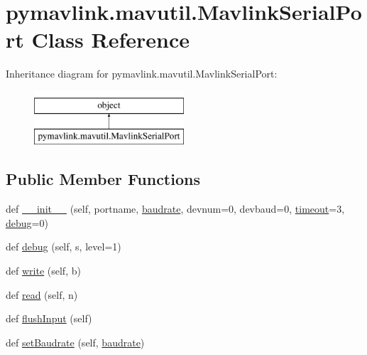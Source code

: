 \hypertarget{classpymavlink_1_1mavutil_1_1MavlinkSerialPort}{}\section{pymavlink.\+mavutil.\+Mavlink\+Serial\+Port Class Reference}
\label{classpymavlink_1_1mavutil_1_1MavlinkSerialPort}
Inheritance diagram for pymavlink.\+mavutil.\+Mavlink\+Serial\+Port\+:\begin{figure}[H]
\begin{center}
\leavevmode
\includegraphics[height=2.000000cm]{classpymavlink_1_1mavutil_1_1MavlinkSerialPort}
\end{center}
\end{figure}
\subsection*{Public Member Functions}
\begin{DoxyCompactItemize}
\item 
def \mbox{\hyperlink{classpymavlink_1_1mavutil_1_1MavlinkSerialPort_ab3d1f1a5a2d3f30628aa6b2e5c8822f0}{\+\_\+\+\_\+init\+\_\+\+\_\+}} (self, portname, \mbox{\hyperlink{classpymavlink_1_1mavutil_1_1MavlinkSerialPort_ab3e0c5df3be011a0a9f99cc75a87ac55}{baudrate}}, devnum=0, devbaud=0, \mbox{\hyperlink{classpymavlink_1_1mavutil_1_1MavlinkSerialPort_a4d25142b726458574a0e15fc6cf97d04}{timeout}}=3, \mbox{\hyperlink{classpymavlink_1_1mavutil_1_1MavlinkSerialPort_a1eb7dbf7a42f76566838ef6552789fcc}{debug}}=0)
\item 
def \mbox{\hyperlink{classpymavlink_1_1mavutil_1_1MavlinkSerialPort_a1eb7dbf7a42f76566838ef6552789fcc}{debug}} (self, s, level=1)
\item 
def \mbox{\hyperlink{classpymavlink_1_1mavutil_1_1MavlinkSerialPort_a8e93f398163539282b8e7b8e1d0e1d94}{write}} (self, b)
\item 
def \mbox{\hyperlink{classpymavlink_1_1mavutil_1_1MavlinkSerialPort_a283f7df07e665e8dfdc627c02872aa6d}{read}} (self, n)
\item 
def \mbox{\hyperlink{classpymavlink_1_1mavutil_1_1MavlinkSerialPort_a88334caabef6a1866bef8601a6b84cf9}{flush\+Input}} (self)
\item 
def \mbox{\hyperlink{classpymavlink_1_1mavutil_1_1MavlinkSerialPort_afdfd22c496aad11500d159499a5c15e0}{set\+Baudrate}} (self, \mbox{\hyperlink{classpymavlink_1_1mavutil_1_1MavlinkSerialPort_ab3e0c5df3be011a0a9f99cc75a87ac55}{baudrate}})
\end{DoxyCompactItemize}

